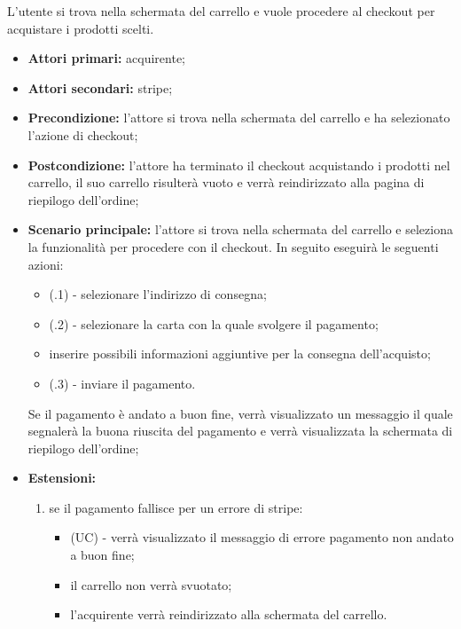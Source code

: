L'utente si trova nella schermata del carrello e vuole procedere al checkout per acquistare i prodotti scelti.
\begin{itemize}
    \item \textbf{Attori primari:} acquirente;
    \item \textbf{Attori secondari:} stripe;
    \item \textbf{Precondizione:} l'attore si trova nella schermata del carrello e ha selezionato l'azione di checkout;
    \item \textbf{Postcondizione:} l'attore ha terminato il checkout acquistando i prodotti nel carrello, il suo carrello risulterà vuoto e verrà reindirizzato alla pagina di riepilogo dell'ordine;
    \item \textbf{Scenario principale:} l'attore si trova nella schermata del carrello e seleziona la funzionalità per procedere con il checkout. In seguito eseguirà le seguenti azioni:
    \begin{itemize}
    	\item (\actualUC.1) - selezionare l'indirizzo di consegna;
    	\item (\actualUC.2) - selezionare la carta con la quale svolgere il pagamento;
    	\item inserire possibili informazioni aggiuntive per la consegna dell'acquisto;
        \item (\actualUC.3) - inviare il pagamento.
    \end{itemize}
    Se il pagamento è andato a buon fine, verrà visualizzato un messaggio il quale segnalerà la buona riuscita del pagamento e verrà visualizzata la schermata di riepilogo dell'ordine;
    \item \textbf{Estensioni:}
    \begin{enumerate}[label=\lett]
        \item se il pagamento fallisce per un errore di stripe:
        \begin{itemize}
            \item (UC) - verrà visualizzato il messaggio di errore pagamento non andato a buon fine;
            \item il carrello non verrà svuotato;
            \item l'acquirente verrà reindirizzato alla schermata del carrello.
        \end{itemize}
    \end{enumerate}
\end{itemize}

\resetSubUC

